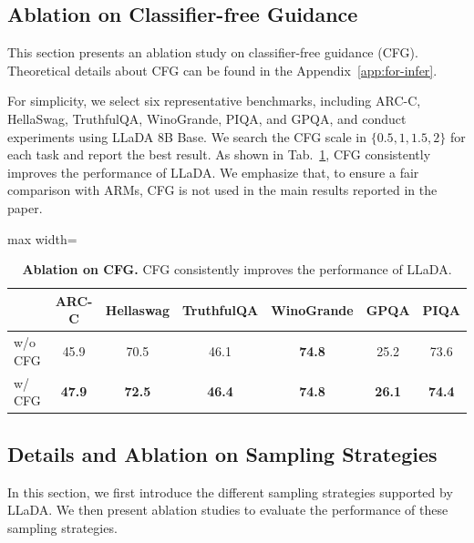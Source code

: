 \documentclass{article}
\begin{document}
\subsection{Ablation on Classifier-free Guidance}
\label{app:cfg}
This section presents an ablation study on classifier-free guidance (CFG). Theoretical details about CFG can be found in the Appendix~\ref{app:for-infer}.

For simplicity, we select six representative benchmarks, including ARC-C, HellaSwag, TruthfulQA, WinoGrande, PIQA, and GPQA, and conduct experiments using LLaDA 8B Base. We search the CFG scale in $\{0.5, 1, 1.5, 2\}$ for each task and report the best result. As shown in Tab.~\ref{tab:ablation-cfg}, CFG consistently improves the performance of LLaDA. We emphasize that, to ensure a fair comparison with ARMs, CFG is not used in the main results reported in the paper.

\begin{table}[t!]
    \centering
    \caption{\textbf{Ablation on CFG.} CFG consistently improves the performance of LLaDA.}
    \label{tab:ablation-cfg}
    \vspace{.2cm}
    \begin{adjustbox}{max width=\textwidth}
    \begin{tabular}{lcccccc}
      \toprule
      & ARC-C & Hellaswag & TruthfulQA & WinoGrande & GPQA & PIQA \\
      \midrule
      w/o CFG & 45.9 & 70.5 & 46.1 & \textbf{74.8} & 25.2 & 73.6 \\
      w/ CFG & \textbf{47.9} & \textbf{72.5} & \textbf{46.4} & \textbf{74.8} & \textbf{26.1} & \textbf{74.4} \\
      \bottomrule
    \end{tabular}
    \end{adjustbox}
    \vspace{-.2cm}
\end{table}





  

\subsection{Details and Ablation on Sampling Strategies}
\label{app:sample}
In this section, we first introduce the different sampling strategies supported by LLaDA. We then present ablation studies to evaluate the performance of these sampling strategies.
\end{document}
